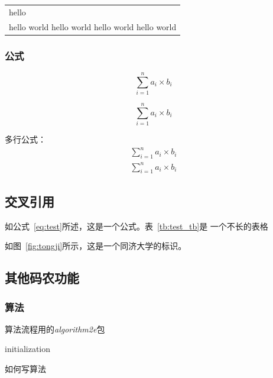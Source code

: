			\begin{tabular}{p{5cm}}
			hello \\ 
			hello world hello world hello world hello world \\ \hline
			\end{tabular}
	
\subsubsection{公式}
	\begin{equation}\label{eq:test}
	\sum_{i=1}^n a_i \times b_i 
	\end{equation}
	
	\begin{equation}
		\sum_{i=1}^n a_i \times b_i 
		\end{equation}
		
	多行公式：
	\begin{eqnarray}
			\sum_{i=1}^n a_i \times b_i  \nonumber \\
				\sum_{i=1}^n a_i \times b_i 
	\end{eqnarray}
\subsection{交叉引用}
	如公式~\ref{eq:test}所述，这是一个公式。表~\ref{tb:test_tb}是
	一个不长的表格
	
	如图~\ref{fig:tongji}所示，这是一个同济大学的标识。
	
\subsection{其他码农功能}
\subsubsection{算法}
算法流程用的\textit{algorithm2e}包
\begin{algorithm}
	 initialization\;
	 \caption{如何写算法}
\end{algorithm}

